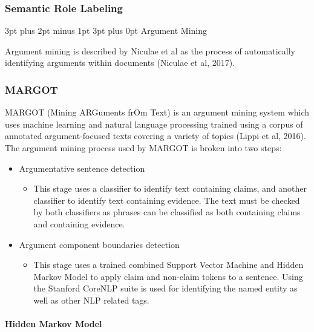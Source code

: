 \documentclass[12pt,a4paper]{article}
\makeatletter
\renewcommand\subsection{\@startsection {subsection}{1}{2mm} %
                               {3pt plus 2pt minus 1pt} %
                               {3pt plus 0pt} %
                               {\normalfont\bfseries}}
\makeatother
\begin{document}
\subsubsection{Semantic Role Labeling}



\subsection{Argument Mining}

Argument mining is described by Niculae et al as the process of automatically identifying arguments within documents (Niculae et al, 2017). 

\subsubsection{MARGOT}

MARGOT (Mining ARGuments frOm Text) is an argument mining system which uses machine learning and natural language processing trained using a corpus of annotated argument-focused texts covering a variety of topics (Lippi et al, 2016). The argument mining process used by MARGOT is broken into two steps:

\begin{itemize}
    \item Argumentative sentence detection
    \begin{itemize}
        \item This stage uses a classifier to identify text containing claims, and another classifier to identify text containing evidence. The text must be checked by both classifiers as phrases can be classified as both containing claims and containing evidence.
    \end{itemize}
    \item Argument component boundaries detection
    \begin{itemize}
        \item This stage uses a trained combined Support Vector Machine and Hidden Markov Model to apply claim and non-claim tokens to a sentence. Using the Stanford CoreNLP suite is used for identifying the named entity as well as other NLP related tags. 
    \end{itemize}
\end{itemize}

\paragraph{Hidden Markov Model}\mbox{}\\
\end{document}
